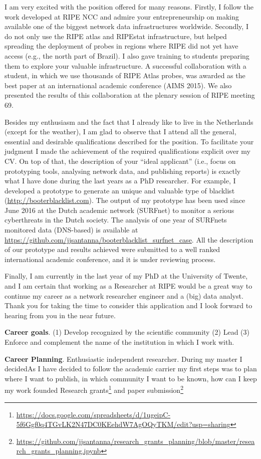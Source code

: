 \documentclass[11pt,a4paper,sans]{moderncv}%
\begin{document}

I am very excited with the position offered for many reasons. Firstly, I follow
the work developed at RIPE NCC and admire your entrepreneurship on making
available one of the biggest network data infrastructures worldwide. Secondly, I
do not only use the RIPE atlas and RIPEstat infrastructure, but helped spreading
the deployment of probes in regions where RIPE did not yet have access (e.g.,
the north part of Brazil). I also gave training to students preparing them to
explore your valuable infrastructure. A successful collaboration with a student,
in which we use thousands of RIPE Atlas probes, was awarded as the best paper at
an international academic conference (AIMS 2015). We also presented the results
of this collaboration at the plenary session of RIPE meeting 69.

Besides my enthusiasm and the fact that I already like to live in the
Netherlands (except for the weather), I am glad to observe that I attend all the
general, essential and desirable qualifications described for the position. To
facilitate your judgment I made the achievement of the required qualifications
explicit over my CV. On top of that, the description of your ``ideal applicant''
(i.e., focus on prototyping tools, analysing network data, and publishing
reports) is exactly what I have done during the last years as a PhD researcher.
For example, I developed a prototype to generate an unique and valuable type of
blacklist (\url{http://booterblacklist.com}). The output of my prototype has
been used since June 2016 at the Dutch academic network (SURFnet) to monitor a
serious cyberthreats in the Dutch society. The analysis of one year of SURFnets
monitored data (DNS-based) is available at
\url{https://github.com/jjsantanna/booterblacklist_surfnet_case}. All the
description of our prototype and results achieved were submitted to a well
ranked international academic conference, and it is under reviewing process.

Finally, I am currently in the last year of my PhD at the University of Twente,
and I am certain that working as a Researcher at RIPE would be a great way to
continue my career as a network researcher engineer and a (big) data analyst.
Thank you for taking the time to consider this application and I look forward to
hearing from you in the near future.

\textbf{Career goals}. (1) Develop
recognized by the scientific community 
(2) Lead
(3) Enforce and complement the name of the institution in which I work with.


\textbf{Career Planning}. Enthusiastic independent researcher. During my master
I decidedAs I have decided to follow the academic carrier my first steps was to
plan where I want to publish, in which community I want to be known, how can I
keep my work founded 	Research
grants\footnote{\url{https://docs.google.com/spreadsheets/d/1ugeipC-5f6Ggf0q4TGvLK2N47DC0KEehdW7AgOQyTKM/edit?usp=sharing}}
and paper
submission\footnote{\url{https://github.com/jjsantanna/research_grants_planning/blob/master/research_grants_planning.ipynb}} 



\makeletterclosing
\end{document}
